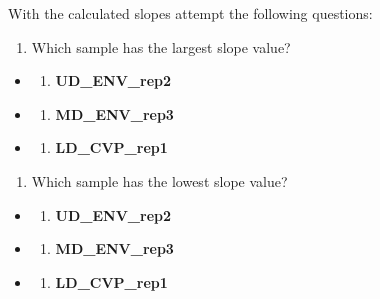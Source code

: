 \documentclass[
]{book}
\providecommand{\tightlist}{%
  \setlength{\itemsep}{0pt}\setlength{\parskip}{0pt}}
\begin{document}
With the calculated slopes attempt the following questions:

\begin{enumerate}
\def\labelenumi{\arabic{enumi}.}
\tightlist
\item
  Which sample has the largest slope value?
\end{enumerate}

\begin{itemize}
\item
  \begin{enumerate}
  \def\labelenumi{(\Alph{enumi})}
  \tightlist
  \item
    \textbf{UD\_ENV\_rep2}\\
  \end{enumerate}
\item
  \begin{enumerate}
  \def\labelenumi{(\Alph{enumi})}
  \setcounter{enumi}{1}
  \tightlist
  \item
    \textbf{MD\_ENV\_rep3}\\
  \end{enumerate}
\item
  \begin{enumerate}
  \def\labelenumi{(\Alph{enumi})}
  \setcounter{enumi}{2}
  \tightlist
  \item
    \textbf{LD\_CVP\_rep1}
  \end{enumerate}
\end{itemize}

\begin{enumerate}
\def\labelenumi{\arabic{enumi}.}
\setcounter{enumi}{1}
\tightlist
\item
  Which sample has the lowest slope value?
\end{enumerate}

\begin{itemize}
\item
  \begin{enumerate}
  \def\labelenumi{(\Alph{enumi})}
  \tightlist
  \item
    \textbf{UD\_ENV\_rep2}\\
  \end{enumerate}
\item
  \begin{enumerate}
  \def\labelenumi{(\Alph{enumi})}
  \setcounter{enumi}{1}
  \tightlist
  \item
    \textbf{MD\_ENV\_rep3}\\
  \end{enumerate}
\item
  \begin{enumerate}
  \def\labelenumi{(\Alph{enumi})}
  \setcounter{enumi}{2}
  \tightlist
  \item
    \textbf{LD\_CVP\_rep1}
  \end{enumerate}
\end{itemize}
\end{document}

